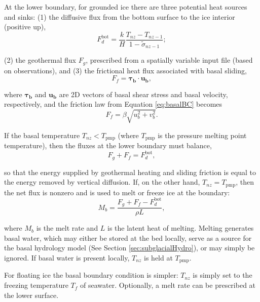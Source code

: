 At the lower boundary, for grounded ice there are three potential heat sources and sinks: (1) the diffusive flux from the bottom surface to the ice interior (positive up),
\begin{equation}
  F_d^{\mathrm{bot}} = \frac{k}{H} \frac{T_{nz} - T_{nz-1}}{1 - \tilde{\sigma}_{nz-1}};
\end{equation}

\noindent
(2) the geothermal flux $F_g$, prescribed from a spatially variable input file (based on observations), and (3) the frictional heat flux associated with basal sliding, 
\begin{equation}
  F_f = \mathbf{\tau_b} \cdot \mathbf{u_b},
\end{equation}

\noindent
where $\mathbf{\tau_b}$ and $\mathbf{u_b}$ are 2D vectors of basal shear stress and basal velocity,
respectively, and the friction law from Equation \ref{eq:basalBC} becomes
\begin{equation}
  F_f = \beta \sqrt{u_b^2 + v_b^2}.
\end{equation}

If the basal temperature $T_{nz} < T_{\mathrm{pmp}}$ 
(where $T_{\mathrm{pmp}}$ is the pressure melting point temperature), then the fluxes at the lower boundary must balance,
\begin{equation}
  \label{eq:basalHeatFlux} 
  F_g + F_f = F_{d}^{\mathrm{bot}},
\end{equation}

\noindent
so that the energy supplied by geothermal heating and sliding friction is equal
to the energy removed by vertical diffusion.
If, on the other hand, $T_{nz} = T_{\mathrm{pmp}}$, then the net flux is nonzero and is used to melt or freeze ice at the boundary:
\begin{equation}
  \label{eq:basalMelt}
  M_b = \frac{F_g + F_f - F_d^{\mathrm{bot}}}{\rho L},
\end{equation}
 
\noindent
where $M_b$ is the melt rate and $L$ is the latent heat of melting.
Melting generates basal water, which may either be stored at the bed locally, serve as a source for the basal hydrology model (See Section \ref{sec:subglacialHydro}), or may simply be ignored. If basal water is present locally, $T_{nz}$ is held at $T_{\mathrm{pmp}}$.

For floating ice the basal boundary condition is simpler: $T_{nz}$ is simply set to the freezing temperature $T_f$ of seawater. Optionally, a melt rate can be prescribed at the lower surface.

